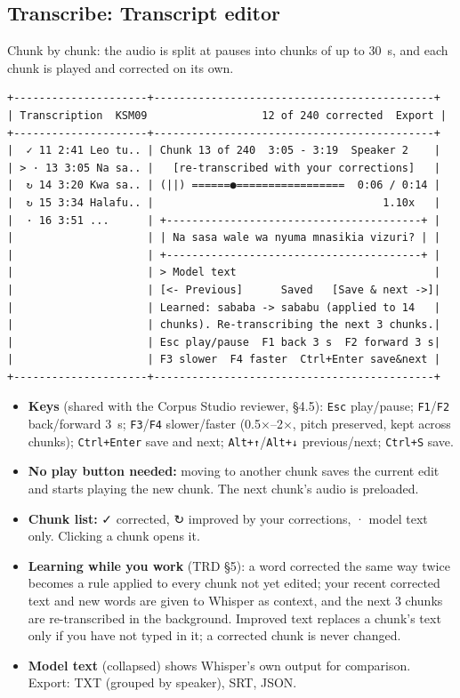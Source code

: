 \documentclass[11pt]{article}
\begin{document}
\hypertarget{transcribe-transcript-editor}{%
\subsection{Transcribe: Transcript editor}\label{transcribe-transcript-editor}}

Chunk by chunk: the audio is split at pauses into chunks of up to 30~s, and each chunk is played and corrected on its own.

\begin{lstlisting}
+---------------------+--------------------------------------------+
| Transcription  KSM09                  12 of 240 corrected  Export |
+---------------------+--------------------------------------------+
|  ✓ 11 2:41 Leo tu.. | Chunk 13 of 240  3:05 - 3:19  Speaker 2    |
| > · 13 3:05 Na sa.. |   [re-transcribed with your corrections]   |
|  ↻ 14 3:20 Kwa sa.. | (||) ======●=================  0:06 / 0:14 |
|  ↻ 15 3:34 Halafu.. |                                    1.10x   |
|  · 16 3:51 ...      | +----------------------------------------+ |
|                     | | Na sasa wale wa nyuma mnasikia vizuri? | |
|                     | +----------------------------------------+ |
|                     | > Model text                               |
|                     | [<- Previous]      Saved   [Save & next ->]|
|                     | Learned: sababa -> sababu (applied to 14   |
|                     | chunks). Re-transcribing the next 3 chunks.|
|                     | Esc play/pause  F1 back 3 s  F2 forward 3 s|
|                     | F3 slower  F4 faster  Ctrl+Enter save&next |
+---------------------+--------------------------------------------+
\end{lstlisting}

\begin{itemize}
\tightlist
\item
  \textbf{Keys} (shared with the Corpus Studio reviewer, §4.5): \texttt{Esc} play/pause; \texttt{F1}/\texttt{F2} back/forward 3~s; \texttt{F3}/\texttt{F4} slower/faster (0.5$\times$--2$\times$, pitch preserved, kept across chunks); \texttt{Ctrl+Enter} save and next; \texttt{Alt+↑}/\texttt{Alt+↓} previous/next; \texttt{Ctrl+S} save.
\item
  \textbf{No play button needed:} moving to another chunk saves the current edit and starts playing the new chunk. The next chunk's audio is preloaded.
\item
  \textbf{Chunk list:} ✓ corrected, ↻ improved by your corrections, · model text only. Clicking a chunk opens it.
\item
  \textbf{Learning while you work} (TRD §5): a word corrected the same way twice becomes a rule applied to every chunk not yet edited; your recent corrected text and new words are given to Whisper as context, and the next 3 chunks are re-transcribed in the background. Improved text replaces a chunk's text only if you have not typed in it; a corrected chunk is never changed.
\item
  \textbf{Model text} (collapsed) shows Whisper's own output for comparison. Export: TXT (grouped by speaker), SRT, JSON.
\end{itemize}
\end{document}
